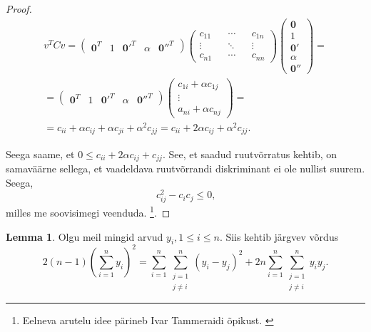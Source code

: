 \documentclass[a4paper,12pt,oneside]{article}
\newcounter{lemma}[section]
\numberwithin{equation}{section}
\theoremstyle{definition}
\newtheorem{helper_2}[lemma]{Lemma}
\begin{document}
\begin{proof}
\begin{equation*}
\begin{gathered}
v^{T}Cv =
\begin{pmatrix}
\mathbf{0}^T & 1 & \mathbf{0'}^T & \alpha & \mathbf{0''}^T
\end{pmatrix}
\begin{pmatrix}
c_{11} && \cdots && c_{1n} \\
\vdots && \ddots && \vdots \\
c_{n1} && \cdots && c_{nn}  
\end{pmatrix}
\begin{pmatrix}
\mathbf{0} \\ 
1 \\
\mathbf{0'} \\
\alpha \\
\mathbf{0''} 
\end{pmatrix}  =\\
= \begin{pmatrix}
\mathbf{0}^T & 1 & \mathbf{0'}^T & \alpha & \mathbf{0''}^T
\end{pmatrix}
\begin{pmatrix}
c_{1i} + \alpha c_{1j} \\
\vdots \\
a_{ni} + \alpha c_{nj} 
\end{pmatrix}
= \\
= c_{ii} + \alpha c_{ij} + \alpha c_{ji} + \alpha^2 c_{jj} = c_{ii} + 2 \alpha c_{ij} + \alpha^2 c_{jj} \text{.}
\end{gathered}
\end{equation*}


Seega saame, et $ 0 \leq c_{ii} + 2\alpha{c_{ij}} + c_{jj}$. See, et saadud ruutvõrratus kehtib, on samaväärne sellega, et vaadeldava ruutvõrrandi diskriminant ei ole nullist suurem. Seega,   
\begin{equation*}
c_{ij}^2 - c_{i}c_{j} \leq 0 \text{,} 
\end{equation*}
milles me soovisimegi veenduda. \footnote{Eelneva arutelu idee pärineb Ivar Tammeraidi õpikust. \cite{Tammeraid1999}}.
\end{proof}  


\begin{helper_2}
Olgu meil mingid arvud $y_i, 1 \leq i  \leq n $.  Siis kehtib järgvev võrdus 
\begin{equation*}
2 \left( n-1 \right) \left( \sum \limits_{i=1}^n y_{i} \right)^2  = \sum \limits_{i=1}^n   \sum \limits_{\substack{j=1 \\ j \neq i}}^{n} (y_{i} - y_{j})^2  +  2 n \sum \limits_{i=1}^n \sum \limits_{\substack{j=1 \\ j \neq i}}^{n} y_{i} y_{j} \text{.}
\end{equation*}
\end{helper_2}
\end{document}
